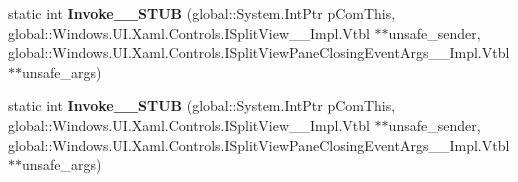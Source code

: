\begin{DoxyCompactItemize}
\mbox{\label{struct_windows_1_1_foundation_1_1_typed_event_handler___a___windows___u_i___xaml___controls___spf724c7b43c58a64da16977f053e6f78f_a9bdb9989841243bd96f4bf9857967ecb}} 
static int {\bfseries Invoke\+\_\+\+\_\+\+S\+T\+UB} (global\+::\+System.\+Int\+Ptr p\+Com\+This, global\+::\+Windows.\+U\+I.\+Xaml.\+Controls.\+I\+Split\+View\+\_\+\+\_\+\+Impl.\+Vtbl $\ast$$\ast$unsafe\+\_\+sender, global\+::\+Windows.\+U\+I.\+Xaml.\+Controls.\+I\+Split\+View\+Pane\+Closing\+Event\+Args\+\_\+\+\_\+\+Impl.\+Vtbl $\ast$$\ast$unsafe\+\_\+args)
\item 
\mbox{\label{struct_windows_1_1_foundation_1_1_typed_event_handler___a___windows___u_i___xaml___controls___spf724c7b43c58a64da16977f053e6f78f_a9bdb9989841243bd96f4bf9857967ecb}} 
static int {\bfseries Invoke\+\_\+\+\_\+\+S\+T\+UB} (global\+::\+System.\+Int\+Ptr p\+Com\+This, global\+::\+Windows.\+U\+I.\+Xaml.\+Controls.\+I\+Split\+View\+\_\+\+\_\+\+Impl.\+Vtbl $\ast$$\ast$unsafe\+\_\+sender, global\+::\+Windows.\+U\+I.\+Xaml.\+Controls.\+I\+Split\+View\+Pane\+Closing\+Event\+Args\+\_\+\+\_\+\+Impl.\+Vtbl $\ast$$\ast$unsafe\+\_\+args)
\end{DoxyCompactItemize}
